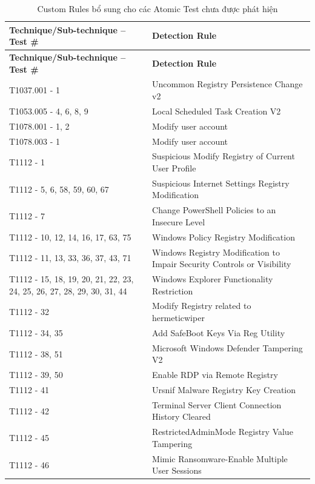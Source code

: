 \begingroup
\small
\renewcommand{\arraystretch}{1.12}
\begin{longtable}{|>{\raggedright\arraybackslash}p{5.2cm}|>{\raggedright\arraybackslash}p{9.0cm}|}
\caption{Custom Rules bổ sung cho các Atomic Test chưa được phát hiện}\label{tab:custom-rule-detections}\\
\hline
\textbf{Technique/Sub-technique -- Test \#} & \textbf{Detection Rule} \\
\hline
\endfirsthead
\hline
\textbf{Technique/Sub-technique -- Test \#} & \textbf{Detection Rule} \\
\hline
\endhead
\hline
\endfoot
\hline
\endlastfoot
T1037.001 - 1 & Uncommon Registry Persistence Change v2 \\ \hline
T1053.005 - 4, 6, 8, 9 & Local Scheduled Task Creation V2 \\ \hline
T1078.001 - 1, 2 & Modify user account \\ \hline
T1078.003 - 1 & Modify user account \\ \hline
T1112 - 1 & Suspicious Modify Registry of Current User Profile \\ \hline
T1112 - 5, 6, 58, 59, 60, 67 & Suspicious Internet Settings Registry Modification \\ \hline
T1112 - 7 & Change PowerShell Policies to an Insecure Level \\ \hline
T1112 - 10, 12, 14, 16, 17, 63, 75 & Windows Policy Registry Modification \\ \hline
T1112 - 11, 13, 33, 36, 37, 43, 71 & Windows Registry Modification to Impair Security Controls or Visibility \\ \hline
T1112 - 15, 18, 19, 20, 21, 22, 23, 24, 25, 26, 27, 28, 29, 30, 31, 44 & Windows Explorer Functionality Restriction \\ \hline
T1112 - 32 & Modify Registry related to hermeticwiper \\ \hline
T1112 - 34, 35 & Add SafeBoot Keys Via Reg Utility \\ \hline
T1112 - 38, 51 & Microsoft Windows Defender Tampering V2 \\ \hline
T1112 - 39, 50 & Enable RDP via Remote Registry \\ \hline
T1112 - 41 & Ursnif Malware Registry Key Creation \\ \hline
T1112 - 42 & Terminal Server Client Connection History Cleared \\ \hline
T1112 - 45 & RestrictedAdminMode Registry Value Tampering \\ \hline
T1112 - 46 & Mimic Ransomware-Enable Multiple User Sessions \\ \hline

\end{longtable}
